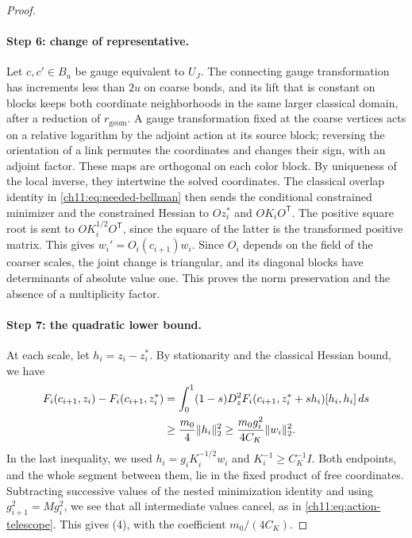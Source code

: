 \begin{proof}
\paragraph{Step 6: change of representative.}
Let $c,c'\in B_u$ be gauge equivalent to $U_J$. The connecting gauge transformation has increments less than $2u$ on coarse bonds, and its lift that is constant on blocks keeps both coordinate neighborhoods in the same larger classical domain, after a reduction of $r_{\mathrm{geom}}$. A gauge transformation fixed at the coarse vertices acts on a relative logarithm by the adjoint action at its source block; reversing the orientation of a link permutes the coordinates and changes their sign, with an adjoint factor. These maps are orthogonal on each color block. By uniqueness of the local inverse, they intertwine the solved coordinates. The classical overlap identity in \eqref{ch11:eq:needed-bellman} then sends the conditional constrained minimizer and the constrained Hessian to $Oz_i^*$ and $OK_iO^{\mathsf T}$. The positive square root is sent to $OK_i^{1/2}O^{\mathsf T}$, since the square of the latter is the transformed positive matrix. This gives $w_i'=O_i(c_{i+1})w_i$. Since $O_i$ depends on the field of the coarser scales, the joint change is triangular, and its diagonal blocks have determinants of absolute value one. This proves the norm preservation and the absence of a multiplicity factor.

\paragraph{Step 7: the quadratic lower bound.}
At each scale, let $h_i=z_i-z_i^*$. By stationarity and the classical Hessian bound, we have
\[
 \begin{split}
 F_i(c_{i+1},z_i)-F_i(c_{i+1},z_i^*)
 &=\int_0^1(1-s)D_z^2F_i(c_{i+1},z_i^*+sh_i)[h_i,h_i]\,ds\\
 &\ge\frac{m_0}4\lVert h_i\rVert_2^2\ge\frac{m_0g_i^2}{4C_K}\lVert w_i\rVert_2^2.
 \end{split}
\]
In the last inequality, we used $h_i=g_iK_i^{-1/2}w_i$ and $K_i^{-1}\ge C_K^{-1}I$. Both endpoints, and the whole segment between them, lie in the fixed product of free coordinates. Subtracting successive values of the nested minimization identity and using $g_{i+1}^2=Mg_i^2$, we see that all intermediate values cancel, as in \eqref{ch11:eq:action-telescope}. This gives (4), with the coefficient $m_0/(4C_K)$.


\end{proof}
